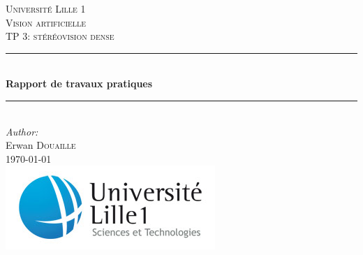 \makeatletter

\begin{titlepage}

\newcommand{\HRule}{\rule{\linewidth}{0.5mm}} %

\center %
 

\textsc{\LARGE Université Lille 1}\\[1.5cm] %
\vspace{7em}
\textsc{\Large Vision artificielle}\\[0.5cm] %
\textsc{\large TP 3: stéréovision dense}\\[0.5cm] %


\vspace{1em}
\HRule \\[0.4cm]
{ \huge \bfseries Rapport de travaux pratiques}\\[0.1cm] %
\HRule \\[2cm]
 

\Large \emph{Author:}\\
Erwan \textsc{Douaille}\\[1cm] %


{\large \today}\\[3cm] %


\includegraphics[scale=0.6]{image/ustl1.jpg}
 

\vfill %

\end{titlepage}
\makeatother

\sloppy